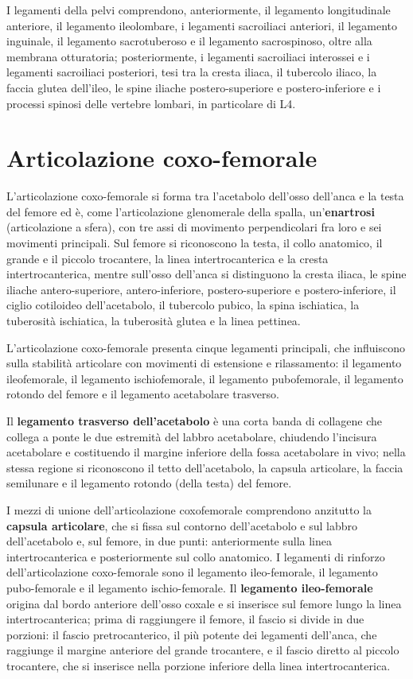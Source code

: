 I legamenti della pelvi comprendono, anteriormente, il legamento
longitudinale anteriore, il legamento ileolombare, i legamenti sacroiliaci
anteriori, il legamento inguinale, il legamento sacrotuberoso e il
legamento sacrospinoso, oltre alla membrana otturatoria; posteriormente, i
legamenti sacroiliaci interossei e i legamenti sacroiliaci posteriori,
tesi tra la cresta iliaca, il tubercolo iliaco, la faccia glutea
dell'ileo, le spine iliache postero-superiore e postero-inferiore e i
processi spinosi delle vertebre lombari, in particolare di L4.

\section{Articolazione coxo-femorale}

L'articolazione coxo-femorale si forma tra l'acetabolo dell'osso dell'anca
e la testa del femore ed è, come l'articolazione glenomerale della spalla,
un'\textbf{enartrosi} (articolazione a sfera), con tre assi di movimento
perpendicolari fra loro e sei movimenti principali. Sul femore si
riconoscono la testa, il collo anatomico, il grande e il piccolo
trocantere, la linea intertrocanterica e la cresta intertrocanterica,
mentre sull'osso dell'anca si distinguono la cresta iliaca, le spine
iliache antero-superiore, antero-inferiore, postero-superiore e
postero-inferiore, il ciglio cotiloideo dell'acetabolo, il tubercolo
pubico, la spina ischiatica, la tuberosità ischiatica, la tuberosità
glutea e la linea pettinea.

L'articolazione coxo-femorale presenta cinque legamenti principali, che
influiscono sulla stabilità articolare con movimenti di estensione e
rilassamento: il legamento ileofemorale, il legamento ischiofemorale, il
legamento pubofemorale, il legamento rotondo del femore e il legamento
acetabolare trasverso.

Il \textbf{legamento trasverso dell'acetabolo} è una corta banda di
collagene che collega a ponte le due estremità del labbro acetabolare,
chiudendo l'incisura acetabolare e costituendo il margine inferiore della
fossa acetabolare in vivo; nella stessa regione si riconoscono il tetto
dell'acetabolo, la capsula articolare, la faccia semilunare e il legamento
rotondo (della testa) del femore.

I mezzi di unione dell'articolazione coxofemorale comprendono anzitutto la
\textbf{capsula articolare}, che si fissa sul contorno dell'acetabolo e sul
labbro dell'acetabolo e, sul femore, in due punti: anteriormente sulla
linea intertrocanterica e posteriormente sul collo anatomico. I legamenti
di rinforzo dell'articolazione coxo-femorale sono il legamento
ileo-femorale, il legamento pubo-femorale e il legamento
ischio-femorale. Il \textbf{legamento ileo-femorale} origina dal bordo
anteriore dell'osso coxale e si inserisce sul femore lungo la linea
intertrocanterica; prima di raggiungere il femore, il fascio si divide in
due porzioni: il fascio pretrocanterico, il più potente dei legamenti
dell'anca, che raggiunge il margine anteriore del grande trocantere, e il
fascio diretto al piccolo trocantere, che si inserisce nella porzione
inferiore della linea intertrocanterica.

